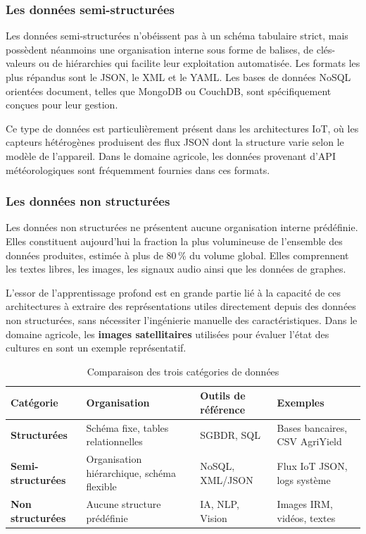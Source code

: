 \subsubsection{Les données semi-structurées}

Les données semi-structurées n'obéissent pas à un schéma tabulaire strict, mais possèdent néanmoins une organisation interne sous forme de balises, de clés-valeurs ou de hiérarchies qui facilite leur exploitation automatisée. Les formats les plus répandus sont le JSON, le XML et le YAML. Les bases de données NoSQL orientées document, telles que MongoDB ou CouchDB, sont spécifiquement conçues pour leur gestion.

Ce type de données est particulièrement présent dans les architectures IoT, où les capteurs hétérogènes produisent des flux JSON dont la structure varie selon le modèle de l'appareil. Dans le domaine agricole, les données provenant d'API météorologiques sont fréquemment fournies dans ces formats.

\subsubsection{Les données non structurées}

Les données non structurées ne présentent aucune organisation interne prédéfinie. Elles constituent aujourd'hui la fraction la plus volumineuse de l'ensemble des données produites, estimée à plus de 80\,\% du volume global. Elles comprennent les textes libres, les images, les signaux audio ainsi que les données de graphes.

L'essor de l'apprentissage profond est en grande partie lié à la capacité de ces architectures à extraire des représentations utiles directement depuis des données non structurées, sans nécessiter l'ingénierie manuelle des caractéristiques. Dans le domaine agricole, les \textbf{images satellitaires} utilisées pour évaluer l'état des cultures en sont un exemple représentatif.

\bigskip
\begin{table}[H]
\centering
\caption{Comparaison des trois catégories de données}
\label{tab:categories-donnees}
\renewcommand{\arraystretch}{1.4}
\begin{tabularx}{\textwidth}{|>{\bfseries}p{3cm}|p{3.5cm}|p{3.5cm}|p{4cm}|}
\hline
\rowcolor{TableHeader}\textbf{Catégorie} & \textbf{Organisation} & \textbf{Outils de référence} & \textbf{Exemples} \\
\hline
Structurées & Schéma fixe, tables relationnelles & SGBDR, SQL & Bases bancaires, CSV AgriYield \\
\hline
Semi-structurées & Organisation hiérarchique, schéma flexible & NoSQL, XML/JSON & Flux IoT JSON, logs système \\
\hline
Non structurées & Aucune structure prédéfinie & IA, NLP, Vision & Images IRM, vidéos, textes \\
\hline
\end{tabularx}
\end{table}

